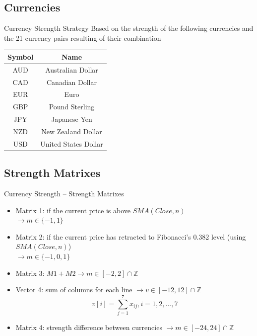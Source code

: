 \documentclass[12pt,portuguese]{beamer}
\begin{document}
\subsection{Currencies}
\begin{frame}{Currency Strength Strategy}
	Based on the strength of the following currencies and the 21 currency pairs resulting of their combination

\begin{table}[!htb]
	\centering
	\begin{tabular}{c|c}
		Symbol & Name \\ \hline\hline
		AUD & Australian Dollar \\
		CAD & Canadian Dollar \\
		EUR & Euro\\
		GBP & Pound Sterling \\
		JPY & Japanese Yen \\
		NZD & New Zealand Dollar \\
		USD & United States Dollar \\
	\end{tabular}
\end{table}

\end{frame}

\subsection{Strength Matrixes}
\begin{frame}{Currency Strength -- Strength Matrixes}
\begin{itemize}
	\item Matrix 1: if the current price is above $SMA(Close, n)$ \\ $\rightarrow m \in \{-1,1\}$
	\item Matrix 2: if the current price has retracted to Fibonacci's 0.382 level (using $SMA(Close, n)$)\\ $\rightarrow m \in \{-1,0,1\}$
	\item Matrix 3: $M1 + M2 \rightarrow m \in [-2,2] \cap \mathbb{Z}$
	\item Vector 4: sum of columns for each line $\rightarrow v \in [-12,12] \cap \mathbb{Z}$
		$$v[i] = \sum_{j=1}^7 x_{ij}, i=1,2, ..., 7$$
	\item Matrix 4: strength difference between currencies $\rightarrow m \in [-24,24] \cap \mathbb{Z}$
\end{itemize}
\end{frame}
\end{document}

